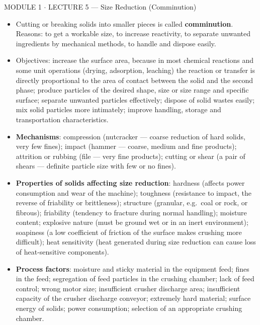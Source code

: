 \documentclass[10pt,a4paper]{article}
\newcommand{\spsection}[1]{%
  \par\addvspace{10pt}\noindent
  \colorbox{accent}{%
    \begin{minipage}{\dimexpr\linewidth-14pt\relax}%
      \color{white}\bfseries\large\strut #1\strut
    \end{minipage}}\par\vspace{4pt}\nopagebreak}
\newcommand{\spsub}[1]{\par\addvspace{7pt}\noindent{\color{accent}\bfseries #1}\par\addvspace{3pt}\nopagebreak}
\providecommand{\textperiodcentered}{\ensuremath{\cdot}}
\begin{document}
\spsection{MODULE 1 \textperiodcentered{} LECTURE 5 --- Size Reduction (Comminution)}

\spsub{Purpose, mechanisms, influencing factors}
\begin{itemize}
  \item Cutting or breaking solids into smaller pieces is called \textbf{comminution}. Reasons: to get a workable size, to increase reactivity, to separate unwanted ingredients by mechanical methods, to handle and dispose easily.
  \item Objectives: increase the surface area, because in most chemical reactions and some unit operations (drying, adsorption, leaching) the reaction or transfer is directly proportional to the area of contact between the solid and the second phase; produce particles of the desired shape, size or size range and specific surface; separate unwanted particles effectively; dispose of solid wastes easily; mix solid particles more intimately; improve handling, storage and transportation characteristics.
  \item \textbf{Mechanisms}: compression (nutcracker --- coarse reduction of hard solids, very few fines); impact (hammer --- coarse, medium and fine products); attrition or rubbing (file --- very fine products); cutting or shear (a pair of shears --- definite particle size with few or no fines).
  \item \textbf{Properties of solids affecting size reduction}: hardness (affects power consumption and wear of the machine); toughness (resistance to impact, the reverse of friability or brittleness); structure (granular, e.g.\ coal or rock, or fibrous); friability (tendency to fracture during normal handling); moisture content; explosive nature (must be ground wet or in an inert environment); soapiness (a low coefficient of friction of the surface makes crushing more difficult); heat sensitivity (heat generated during size reduction can cause loss of heat-sensitive components).
  \item \textbf{Process factors}: moisture and sticky material in the equipment feed; fines in the feed; segregation of feed particles in the crushing chamber; lack of feed control; wrong motor size; insufficient crusher discharge area; insufficient capacity of the crusher discharge conveyor; extremely hard material; surface energy of solids; power consumption; selection of an appropriate crushing chamber.
\end{itemize}
\end{document}
